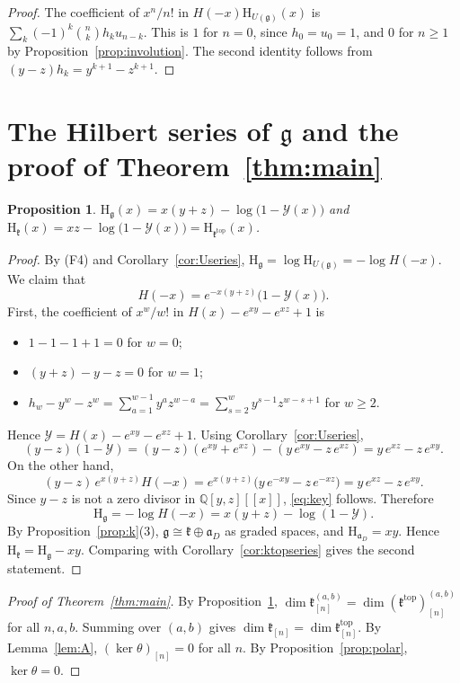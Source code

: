 \documentclass[11pt]{amsart}
\newtheorem{proposition}[theorem]{Proposition}
\theoremstyle{definition}
\theoremstyle{remark}
\newcommand{\Q}{\mathbb{Q}}
\newcommand{\g}{\mathfrak{g}}
\newcommand{\kr}{\mathfrak{k}}
\newcommand{\ktop}{\mathfrak{k}^{\mathrm{top}}}
\newcommand{\af}{\mathfrak{a}}
\newcommand{\Hs}{\mathrm{H}}
\begin{document}
\begin{proof}
The coefficient of $x^n/n!$ in $H(-x)\Hs_{U(\g)}(x)$ is $\sum_k(-1)^k\binom nkh_ku_{n-k}$. This is $1$ for $n=0$, since $h_0=u_0=1$, and $0$ for $n\ge1$ by Proposition~\ref{prop:involution}. The second identity follows from $(y-z)h_k=y^{k+1}-z^{k+1}$.
\end{proof}

\section{The Hilbert series of \texorpdfstring{$\g$}{g} and the proof of Theorem~\ref{thm:main}}\label{sec:hilbert}

\begin{proposition}\label{prop:gseries}
$\Hs_{\g}(x)=x(y+z)-\log\big(1-\mathcal Y(x)\big)$ and $\Hs_{\kr}(x)=xz-\log\big(1-\mathcal Y(x)\big)=\Hs_{\ktop}(x)$.
\end{proposition}

\begin{proof}
By (F4) and Corollary~\ref{cor:Useries}, $\Hs_{\g}=\log\Hs_{U(\g)}=-\log H(-x)$. We claim that
\begin{equation}\label{eq:key}
H(-x)=e^{-x(y+z)}\big(1-\mathcal Y(x)\big).
\end{equation}
First, the coefficient of $x^w/w!$ in $H(x)-e^{xy}-e^{xz}+1$ is
\begin{itemize}
\item $1-1-1+1=0$ for $w=0$;
\item $(y+z)-y-z=0$ for $w=1$;
\item $h_w-y^w-z^w=\sum_{a=1}^{w-1}y^az^{w-a}=\sum_{s=2}^wy^{s-1}z^{w-s+1}$ for $w\ge2$.
\end{itemize}
Hence $\mathcal Y=H(x)-e^{xy}-e^{xz}+1$. Using Corollary~\ref{cor:Useries},
\[
(y-z)(1-\mathcal Y)=(y-z)(e^{xy}+e^{xz})-(y\,e^{xy}-z\,e^{xz})=y\,e^{xz}-z\,e^{xy}.
\]
On the other hand,
\[
(y-z)\,e^{x(y+z)}H(-x)=e^{x(y+z)}\big(y\,e^{-xy}-z\,e^{-xz}\big)=y\,e^{xz}-z\,e^{xy}.
\]
Since $y-z$ is not a zero divisor in $\Q[y,z][[x]]$, \eqref{eq:key} follows. Therefore
\[
\Hs_\g=-\log H(-x)=x(y+z)-\log(1-\mathcal Y).
\]
By Proposition~\ref{prop:k}(3), $\g\cong\kr\oplus\af_D$ as graded spaces, and $\Hs_{\af_D}=xy$. Hence $\Hs_\kr=\Hs_\g-xy$. Comparing with Corollary~\ref{cor:ktopseries} gives the second statement.
\end{proof}

\begin{proof}[Proof of Theorem~\ref{thm:main}]
By Proposition~\ref{prop:gseries}, $\dim\kr_{[n]}^{(a,b)}=\dim(\ktop)_{[n]}^{(a,b)}$ for all $n,a,b$. Summing over $(a,b)$ gives $\dim\kr_{[n]}=\dim\ktop_{[n]}$. By Lemma~\ref{lem:A}, $(\ker\theta)_{[n]}=0$ for all $n$. By Proposition~\ref{prop:polar}, $\ker\theta=0$.
\end{proof}
\end{document}
